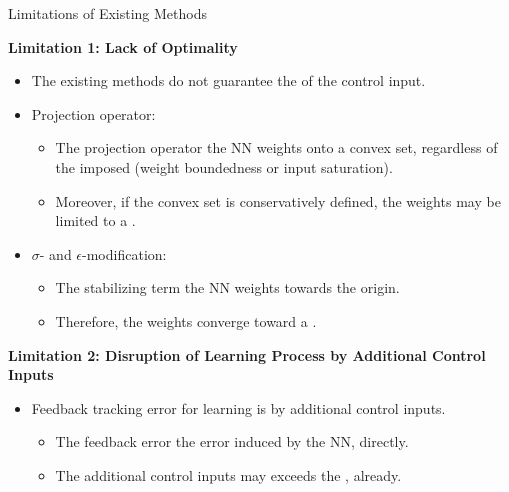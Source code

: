 \documentclass[8pt, aspectratio=169]{beamer}
\newcommand{\ctxt}[2]{\color{#1}{#2}\color{black}}
\begin{document}
\begin{frame}{\insertsubsectionhead}{Limitations of Existing Methods}

  {
    \textbf{Limitation 1: Lack of Optimality}
  }
  \begin{itemize}
    \item<2-> The existing methods do not guarantee the \ctxt{airforceblue}{optimality } of the control input.
    \item<3-> Projection operator:
    \begin{itemize}
      \item The projection operator \ctxt{awesome}{simply projects } the NN weights onto a convex set, regardless of the imposed \ctxt{airforceblue}{constraints } (\eg weight boundedness or input saturation).
      \item Moreover, if the convex set is conservatively defined, the weights may be limited to a \ctxt{awesome}{suboptimal region}.
    \end{itemize}
    \item<4-> $\sigma$- and $\epsilon$-modification:
    \begin{itemize}
      \item The stabilizing term \ctxt{awesome}{biases } the NN weights towards the origin.
      \item Therefore, the weights converge toward a \ctxt{awesome}{suboptimal point}.
    \end{itemize}
  \end{itemize}

  {
    \textbf{Limitation 2: Disruption of Learning Process by Additional Control Inputs}
  }
  \begin{itemize}
    \item<5-> Feedback tracking error for learning is \ctxt{awesome}{disrupted } by additional control inputs.
      \begin{itemize}
        \item The feedback error \ctxt{airforceblue}{does not reflect } the error induced by the NN, directly.
        \item The additional control inputs may exceeds the \ctxt{awesome}{input saturation limits }, already.
    \end{itemize}  
  \end{itemize}

\end{frame}
\end{document}
